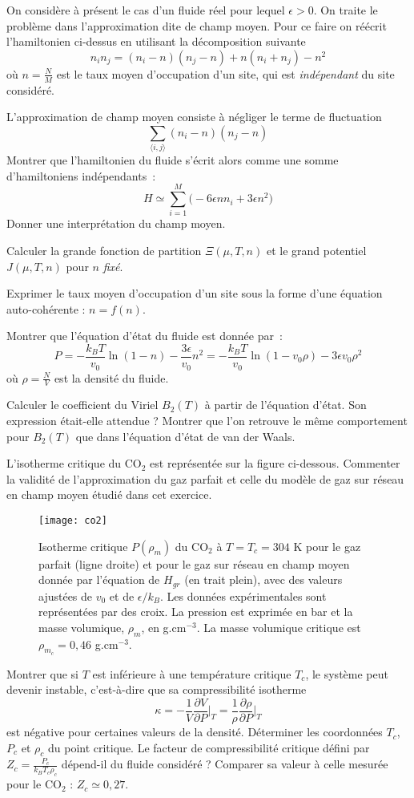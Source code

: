 \documentclass[utf8, 11pt]{feuille}
\begin{document}
On considère à présent le cas d'un fluide réel pour lequel $\epsilon>0$. On traite le problème dans l'approximation dite de champ moyen. Pour ce faire on réécrit l'hamiltonien ci-dessus en utilisant la décomposition suivante
$$
n_i n_j = (n_i -n)(n_j -n)+ n(n_i+n_j)-n^2
$$
où $n=\frac{N}{M}$ est le taux moyen d'occupation d'un site, qui est {\it indépendant} du site considéré.

\question
L'approximation de champ moyen consiste à négliger le terme de fluctuation
$$
\sum_{\langle i,j\rangle} (n_i -n)(n_j -n)
$$
Montrer que l'hamiltonien du fluide s'écrit alors comme une somme d'hamiltoniens indépendants~:
$$
H \simeq \sum_{i=1}^{M}\bigg(-6\epsilon n n_i+ 3\epsilon n^2 \bigg)
$$
Donner une interprétation du \og champ moyen\fg.

\question
Calculer la grande fonction de partition $\Xi(\mu,T,n)$ et le grand potentiel $J(\mu,T,n)$ pour $n$ {\it fixé}.

\question
Exprimer le taux moyen d'occupation d'un site sous la forme d'une équation auto-cohérente : $n=f(n)$.

\question
Montrer que l'équation d'état du fluide est donnée par~:
$$
P=-\frac{k_BT}{v_0} \ln(1-n) -\frac{3\epsilon} {v_0}n^2 =-\frac{k_BT}{v_0} \ln(1-v_0\rho) -3\epsilon v_0 \rho^2
$$
où $\rho=\frac{N}{V}$ est la densité du fluide. 

\question
Calculer le coefficient du Viriel $B_2(T)$ à partir de l'équation d'état. Son expression était-elle attendue ? Montrer que l'on retrouve le même comportement pour $B_2(T)$ que dans l'équation d'état de van der Waals.

\question
L'isotherme critique du CO$_2$ est représentée sur la figure ci-dessous. Commenter la validité de l'approximation du gaz parfait et celle du modèle de gaz sur réseau en champ moyen étudié dans cet exercice.


\begin{figure}[h!]
  \centering
  \texttt{[image: co2]}
  \caption{Isotherme critique $P(\rho_m)$ du CO$_2$ à $T=T_c=304$ K
    pour le gaz parfait (ligne droite) et pour le gaz sur réseau en
    champ moyen donnée par l'équation de $H_{gr}$ (en trait
    plein), avec des valeurs ajustées de $v_0$ et de $\epsilon/k_B$. Les données expérimentales
    sont représentées par des croix. La pression est exprimée en bar
    et la masse volumique, $\rho_m$, en g.cm$^{-3}$. La masse
    volumique critique est $\rho_{m_{c}}=0,46$ g.cm$^{-3}$.}
\end{figure}


\question
Montrer que si $T$ est inférieure à une température critique $T_c$, le système peut devenir instable, c'est-à-dire que sa compressibilité isotherme
$$
\kappa =-\frac{1}{V} \frac{\partial V}{\partial P}\bigg|_T= \frac{1}{\rho} \frac{\partial \rho}{\partial P}\bigg|_T
$$
est négative pour certaines valeurs de la densité.  Déterminer les coordonnées $T_c$, $P_c$ et $\rho_c$ du point critique. Le facteur de compressibilité critique défini par $\displaystyle Z_c=\frac{P_c}{k_BT_c\rho_c}$ dépend-il du fluide considéré ? Comparer sa valeur à celle mesurée pour le CO$_2$ : $Z_c\simeq 0,27$.
\end{document}
